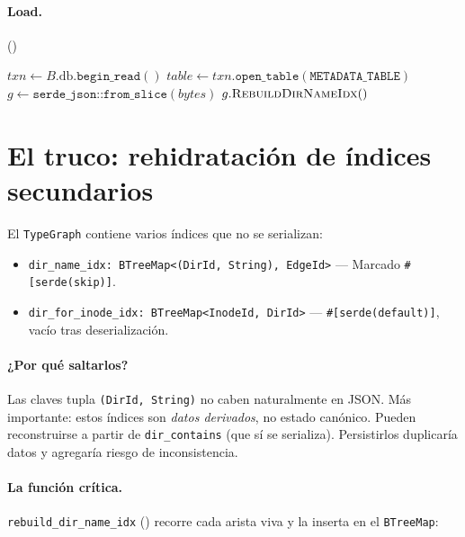 \paragraph{Load.} ()

\begin{algorithm}[H]
\SetAlgoLined
{}
\caption{\textsc{Backend.Load}}\label{alg:load}

$\textit{txn} \gets B.\textrm{db}.\texttt{begin\_read}()$\;
$\textit{table} \gets \textit{txn}.\texttt{open\_table}(\texttt{METADATA\_TABLE})$\;
$g \gets \texttt{serde\_json::from\_slice}(\textit{bytes})$\;
$g.\textsc{RebuildDirNameIdx}()$
\;
\end{algorithm}

\section{El truco: rehidratación de índices secundarios}

El \texttt{TypeGraph} contiene varios índices que no se serializan:

\begin{itemize}
  \item \texttt{dir\_name\_idx: BTreeMap<(DirId, String), EdgeId>} —
    Marcado \texttt{\#[serde(skip)]}.
  \item \texttt{dir\_for\_inode\_idx: BTreeMap<InodeId, DirId>} —
    \texttt{\#[serde(default)]}, vacío tras deserialización.
\end{itemize}

\paragraph{¿Por qué saltarlos?} Las claves tupla \texttt{(DirId,
String)} no caben naturalmente en JSON. Más importante: estos índices
son \emph{datos derivados}, no estado canónico. Pueden reconstruirse a
partir de \texttt{dir\_contains} (que sí se serializa). Persistirlos
duplicaría datos y agregaría riesgo de inconsistencia.

\paragraph{La función crítica.} \texttt{rebuild\_dir\_name\_idx}
() recorre cada arista
\econtains{} viva y la inserta en el \texttt{BTreeMap}:

